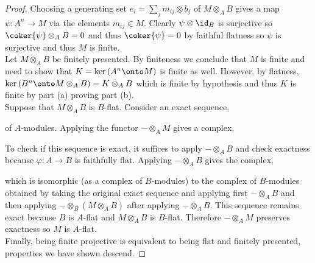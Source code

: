 \documentclass[12pt]{article}
\begin{document}
\begin{proof}
Choosing a generating set $e_i = \sum_j m_{ij} \otimes b_j$ of $M \otimes_A B$ gives a map $\psi : A^n \to M$ via the elements $m_{ij} \in M$. Clearly $\psi \otimes \id_B$ is surjective so $\coker{\psi} \otimes_A B = 0$ and thus $\coker{\psi} = 0$ by faithful flatness so $\psi$ is surjective and thus $M$ is finite. 
\bigskip\\
Let $M \otimes_A B$ be finitely presented. By finiteness we conclude that $M$ is finite and need to show that $K = \ker{(A^n \onto M)}$ is finite as well. However, by flatness, $\ker{(B^n \onto M \otimes_A B)} = K \otimes_A B$ which is finite by hypothesis and thus $K$ is finite by part (a) proving part (b).
\bigskip\\
Suppose that $M \otimes_A B$ is $B$-flat. Consider an exact sequence,
\begin{center}
\end{center}
of $A$-modules. Applying the functor $- \otimes_A M$ gives a complex,
\begin{center}
\end{center}
To check if this sequence is exact, it suffices to apply $- \otimes_A B$ and check exactness because $\varphi : A \to B$ is faithfully flat. Applying $- \otimes_A B$ gives the complex,
\begin{center}
\end{center}
which is isomorphic (as a complex of $B$-modules) to the complex of $B$-modules obtained by taking the original exact sequence and applying first $- \otimes_A B$ and then applying $- \otimes_B (M \otimes_A B)$ after applying $- \otimes_A B$. This sequence remains exact because $B$ is $A$-flat and $M \otimes_A B$ is $B$-flat. Therefore $- \otimes_A M$ preserves exactness so $M$ is $A$-flat.
\bigskip\\
Finally, being finite projective is equivalent to being flat and finitely presented, properties we have shown descend.
\end{proof}
\end{document}
